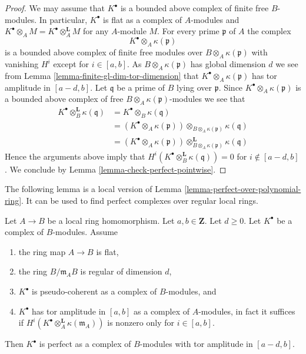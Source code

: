 \begin{proof}
We may assume that $K^\bullet$ is a bounded above complex of
finite free $B$-modules. In particular, $K^\bullet$ is flat as a
complex of $A$-modules and
$K^\bullet \otimes_A M = K^\bullet \otimes_A^{\mathbf{L}} M$ for any
$A$-module $M$. For every prime $\mathfrak p$ of $A$ the complex
$$
K^\bullet \otimes_A \kappa(\mathfrak p)
$$
is a bounded above complex of finite free modules over
$B \otimes_A \kappa(\mathfrak p)$ with vanishing $H^i$ except
for $i \in [a, b]$. As $B \otimes_A \kappa(\mathfrak p)$
has global dimension $d$ we see from
Lemma \ref{lemma-finite-gl-dim-tor-dimension}
that $K^\bullet \otimes_A \kappa(\mathfrak p)$ has tor amplitude in
$[a - d, b]$. Let $\mathfrak q$ be a prime of $B$ lying over $\mathfrak p$.
Since $K^\bullet \otimes_A \kappa(\mathfrak p)$ is a bounded above
complex of free $B \otimes_A \kappa(\mathfrak p)$-modules we see
that
\begin{align*}
K^\bullet \otimes_B^{\mathbf{L}} \kappa(\mathfrak q)
& = K^\bullet \otimes_B \kappa(\mathfrak q) \\
& = (K^\bullet \otimes_A \kappa(\mathfrak p))
\otimes_{B \otimes_A \kappa(\mathfrak p)} \kappa(\mathfrak q) \\
& = (K^\bullet \otimes_A \kappa(\mathfrak p))
\otimes^{\mathbf{L}}_{B \otimes_A \kappa(\mathfrak p)} \kappa(\mathfrak q)
\end{align*}
Hence the arguments above imply that
$H^i(K^\bullet \otimes_B^{\mathbf{L}} \kappa(\mathfrak q)) = 0$
for $i \not \in [a - d, b]$. We conclude by
Lemma \ref{lemma-check-perfect-pointwise}.
\end{proof}

\noindent
The following lemma is a local version of
Lemma \ref{lemma-perfect-over-polynomial-ring}.
It can be used to find perfect complexes over regular local rings.

\begin{lemma}
\label{lemma-perfect-over-regular-local-ring}
Let $A \to B$ be a local ring homomorphism.
Let $a, b \in \mathbf{Z}$. Let $d \geq 0$.
Let $K^\bullet$ be a complex of $B$-modules. Assume
\begin{enumerate}
\item the ring map $A \to B$ is flat,
\item the ring $B/\mathfrak m_AB$ is regular of dimension $d$,
\item $K^\bullet$ is pseudo-coherent as a complex of $B$-modules, and
\item $K^\bullet$ has tor amplitude in $[a, b]$ as a complex
of $A$-modules, in fact it suffices if
$H^i(K^\bullet \otimes_A^\mathbf{L} \kappa(\mathfrak m_A))$
is nonzero only for $i \in [a, b]$.
\end{enumerate}
Then $K^\bullet$ is perfect as a complex of $B$-modules
with tor amplitude in $[a - d, b]$.
\end{lemma}

